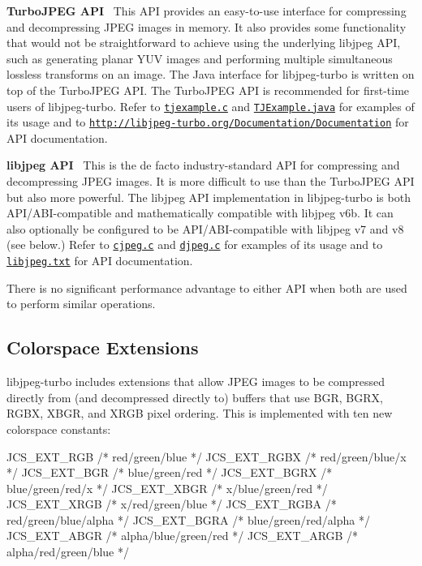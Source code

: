 \begin{DoxyItemize}
\item {\bfseries Turbo\+J\+P\+EG A\+PI}~\newline
 This A\+PI provides an easy-\/to-\/use interface for compressing and decompressing J\+P\+EG images in memory. It also provides some functionality that would not be straightforward to achieve using the underlying libjpeg A\+PI, such as generating planar Y\+UV images and performing multiple simultaneous lossless transforms on an image. The Java interface for libjpeg-\/turbo is written on top of the Turbo\+J\+P\+EG A\+PI. The Turbo\+J\+P\+EG A\+PI is recommended for first-\/time users of libjpeg-\/turbo. Refer to \href{tjexample.c}{\tt tjexample.\+c} and \href{java/TJExample.java}{\tt T\+J\+Example.\+java} for examples of its usage and to \href{http://libjpeg-turbo.org/Documentation/Documentation}{\tt http\+://libjpeg-\/turbo.\+org/\+Documentation/\+Documentation} for A\+PI documentation.
\item {\bfseries libjpeg A\+PI}~\newline
 This is the de facto industry-\/standard A\+PI for compressing and decompressing J\+P\+EG images. It is more difficult to use than the Turbo\+J\+P\+EG A\+PI but also more powerful. The libjpeg A\+PI implementation in libjpeg-\/turbo is both A\+P\+I/\+A\+B\+I-\/compatible and mathematically compatible with libjpeg v6b. It can also optionally be configured to be A\+P\+I/\+A\+B\+I-\/compatible with libjpeg v7 and v8 (see below.) Refer to \href{cjpeg.c}{\tt cjpeg.\+c} and \href{djpeg.c}{\tt djpeg.\+c} for examples of its usage and to \href{libjpeg.txt}{\tt libjpeg.\+txt} for A\+PI documentation.
\end{DoxyItemize}

There is no significant performance advantage to either A\+PI when both are used to perform similar operations.

\subsection*{Colorspace Extensions }

libjpeg-\/turbo includes extensions that allow J\+P\+EG images to be compressed directly from (and decompressed directly to) buffers that use B\+GR, B\+G\+RX, R\+G\+BX, X\+B\+GR, and X\+R\+GB pixel ordering. This is implemented with ten new colorspace constants\+: \begin{DoxyVerb}JCS_EXT_RGB   /* red/green/blue */
JCS_EXT_RGBX  /* red/green/blue/x */
JCS_EXT_BGR   /* blue/green/red */
JCS_EXT_BGRX  /* blue/green/red/x */
JCS_EXT_XBGR  /* x/blue/green/red */
JCS_EXT_XRGB  /* x/red/green/blue */
JCS_EXT_RGBA  /* red/green/blue/alpha */
JCS_EXT_BGRA  /* blue/green/red/alpha */
JCS_EXT_ABGR  /* alpha/blue/green/red */
JCS_EXT_ARGB  /* alpha/red/green/blue */
\end{DoxyVerb}


